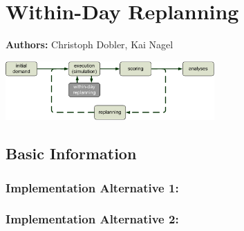 \chapter{Within-Day Replanning}
\label{ch:withinday}

\hfill \textbf{Authors:} Christoph Dobler, Kai Nagel

\begin{center} \includegraphics[width=0.6\textwidth, angle=0]{extending/figures/WithinDayReplanning/WithinDayMATSimLoop} \end{center}


\section{Basic Information}
\label{sec:withinDay-stdInfo}
\subsection{Implementation Alternative 1:}
\label{sec:withinDay1-stdInfo}


\subsection{Implementation Alternative 2:}
\label{sec:withinDay2-stdInfo}

